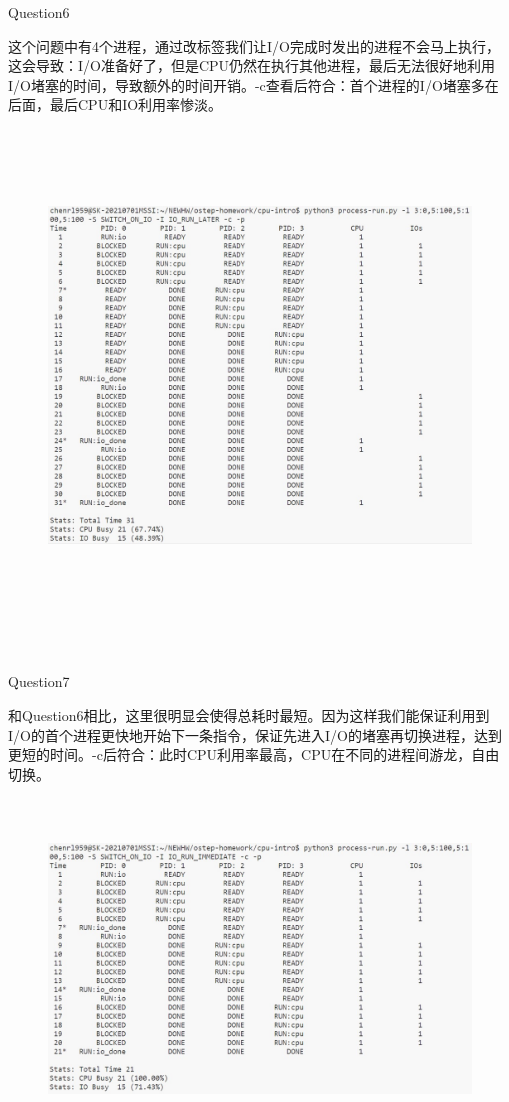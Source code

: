\documentclass[12pt]{article}
\begin{document}
\newpage
\begin{large}
    \noindent Question6\\
\end{large}
\hspace*{2em}这个问题中有4个进程，通过改标签我们让I/O完成时发出的进程不会马上执行，这会导致：I/O准备好了，但是CPU仍然在执行其他进程，最后无法很好地利用I/O堵塞的时间，导致额外的时间开销。-c查看后符合：首个进程的I/O堵塞多在后面，最后CPU和IO利用率惨淡。
\begin{figure}[h]
    \centering
    \includegraphics[height=13cm,width=13cm]{HW2-6.jpg}
\end{figure}\\
\begin{large}
    \noindent Question7\\
\end{large}
\hspace*{2em}和Question6相比，这里很明显会使得总耗时最短。因为这样我们能保证利用到I/O的首个进程更快地开始下一条指令，保证先进入I/O的堵塞再切换进程，达到更短的时间。-c后符合：此时CPU利用率最高，CPU在不同的进程间游龙，自由切换。
\newpage
\begin{figure}[h]
    \centering
    \includegraphics[height=9cm,width=13cm]{HW2-7.jpg}
\end{figure}
\end{document}
